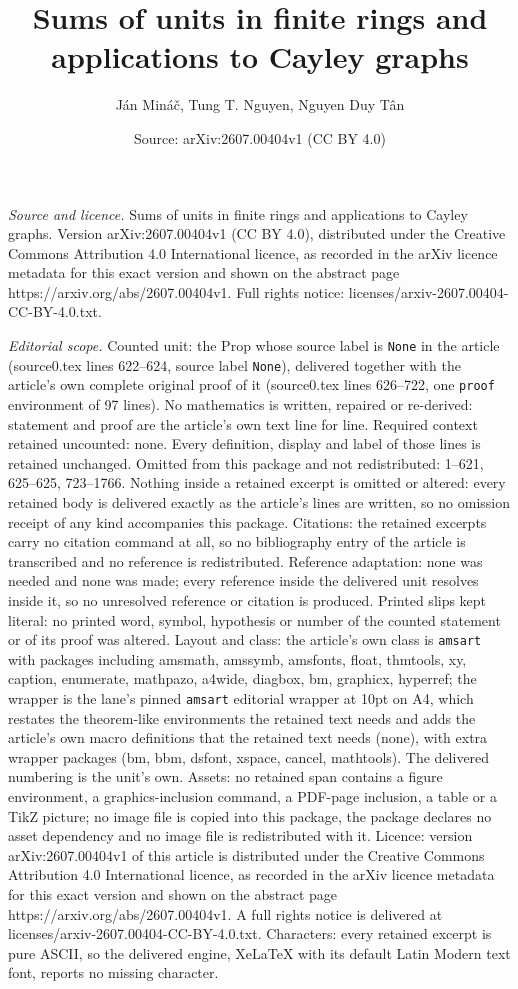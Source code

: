 \documentclass[10pt,a4paper]{amsart}
\title[Sums of units in finite rings and applications to Cayley gra]{Sums of units in finite rings and applications to Cayley graphs}
\author{J\'an Min\'a\v{c}, Tung T. Nguyen, Nguyen Duy T\^an}
\date{Source: arXiv:2607.00404v1 (CC BY 4.0)}
\begin{document}
\maketitle

\noindent\emph{Source and licence.} Sums of units in finite rings and applications to Cayley graphs. Version arXiv:2607.00404v1 (CC BY 4.0), distributed under the Creative Commons Attribution 4.0 International licence, as recorded in the arXiv licence metadata for this exact version and shown on the abstract page https://arxiv.org/abs/2607.00404v1. Full rights notice: licenses/arxiv-2607.00404-CC-BY-4.0.txt.\par\smallskip

\noindent\textit{Editorial scope.} Counted unit: the Prop whose source label is \texttt{None} in the article (source0.tex lines 622--624, source label \texttt{None}), delivered together with the article's own complete original proof of it (source0.tex lines 626--722, one \texttt{proof} environment of 97 lines). No mathematics is written, repaired or re-derived: statement and proof are the article's own text line for line. Required context retained uncounted: none. Every definition, display and label of those lines is retained unchanged. Omitted from this package and not redistributed: 1--621, 625--625, 723--1766. Nothing inside a retained excerpt is omitted or altered: every retained body is delivered exactly as the article's lines are written, so no omission receipt of any kind accompanies this package. Citations: the retained excerpts carry no citation command at all, so no bibliography entry of the article is transcribed and no reference is redistributed. Reference adaptation: none was needed and none was made; every reference inside the delivered unit resolves inside it, so no unresolved reference or citation is produced. Printed slips kept literal: no printed word, symbol, hypothesis or number of the counted statement or of its proof was altered. Layout and class: the article's own class is \texttt{amsart} with packages including amsmath, amssymb, amsfonts, float, thmtools, xy, caption, enumerate, mathpazo, a4wide, diagbox, bm, graphicx, hyperref; the wrapper is the lane's pinned \texttt{amsart} editorial wrapper at 10pt on A4, which restates the theorem-like environments the retained text needs and adds the article's own macro definitions that the retained text needs (none), with extra wrapper packages (bm, bbm, dsfont, xspace, cancel, mathtools). The delivered numbering is the unit's own. Assets: no retained span contains a figure environment, a graphics-inclusion command, a PDF-page inclusion, a table or a TikZ picture; no image file is copied into this package, the package declares no asset dependency and no image file is redistributed with it. Licence: version arXiv:2607.00404v1 of this article is distributed under the Creative Commons Attribution 4.0 International licence, as recorded in the arXiv licence metadata for this exact version and shown on the abstract page https://arxiv.org/abs/2607.00404v1. A full rights notice is delivered at licenses/arxiv-2607.00404-CC-BY-4.0.txt. Characters: every retained excerpt is pure ASCII, so the delivered engine, XeLaTeX with its default Latin Modern text font, reports no missing character.
\end{document}
